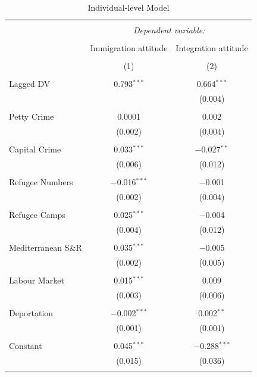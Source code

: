 \documentclass{article}
\begin{document}
\begin{table}[!htbp] \centering 
  \caption{Individual-level Model} 
  \label{} 
\begin{tabular}{@{\extracolsep{5pt}}lcc} 
\\[-1.8ex]\hline 
\hline \\[-1.8ex] 
 & \multicolumn{2}{c}{\textit{Dependent variable:}} \\ 
\cline{2-3} 
\\[-1.8ex] & Immigration attitude & Integration attitude \\ 
\\[-1.8ex] & (1) & (2)\\ 
\hline \\[-1.8ex] 
 Lagged DV & 0.793$^{***}$ & 0.664$^{***}$ \\ 
  &  & (0.004) \\ 
  & & \\ 
 Petty Crime & 0.0001 & 0.002 \\ 
  & (0.002) & (0.004) \\ 
  & & \\ 
 Capital Crime & 0.033$^{***}$ & $-$0.027$^{**}$ \\ 
  & (0.006) & (0.012) \\ 
  & & \\ 
 Refugee Numbers & $-$0.016$^{***}$ & $-$0.001 \\ 
  & (0.002) & (0.004) \\ 
  & & \\ 
 Refugee Camps & 0.025$^{***}$ & $-$0.004 \\ 
  & (0.004) & (0.012) \\ 
  & & \\ 
 Mediterranean S\&R & 0.035$^{***}$ & $-$0.005 \\ 
  & (0.002) & (0.005) \\ 
  & & \\ 
 Labour Market & 0.015$^{***}$ & 0.009 \\ 
  & (0.003) & (0.006) \\ 
  & & \\ 
 Deportation & $-$0.002$^{***}$ & 0.002$^{**}$ \\ 
  & (0.001) & (0.001) \\ 
  & & \\ 
 Constant & 0.045$^{***}$ & $-$0.288$^{***}$ \\ 
  & (0.015) & (0.036) \\ 
  & & \\ 

\end{tabular}
\end{table}
\end{document}
